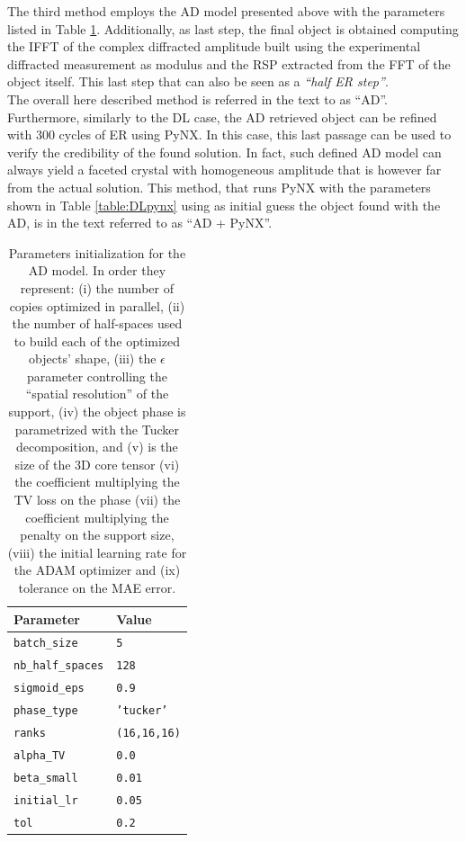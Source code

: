 The third method employs the AD model presented above with the parameters listed in Table \ref{table:AD}. 
Additionally, as last step, the final object is obtained computing the IFFT of the complex diffracted amplitude built 
using the experimental diffracted measurement as modulus and the RSP extracted from the FFT of the object itself.
This last step that can also be seen as a \textit{``half ER step''}.\\
The overall here described method is referred in the text to as ``AD''. 
Furthermore, similarly to the DL case, the AD retrieved object can be refined with 300 cycles of ER using PyNX. In this case, 
this last passage can be used to verify the credibility of the found solution. In fact, such defined AD model can always yield 
a faceted crystal with homogeneous amplitude that is however far from the actual solution. This method, that runs PyNX with the 
parameters shown in Table \ref{table:DLpynx} using as initial guess the object found with the AD, is in the text referred to as 
``AD + PyNX''. 

\begin{table}[H] 

  \centering
  {%
    \begin{tabular}{|l|l|}
      \hline
      \textbf{Parameter} & \textbf{Value} \\
      \hline 
      \texttt{batch\_size}                      & \texttt{5} \\
      \texttt{nb\_half\_spaces}                 & \texttt{128} \\
      \texttt{sigmoid\_eps}                     & \texttt{0.9} \\
      \texttt{phase\_type}                      & \texttt{'tucker'} \\
      \texttt{ranks}                            & \texttt{(16,16,16)} \\
      \texttt{alpha\_TV}                        & \texttt{0.0} \\
      \texttt{beta\_small}                      & \texttt{0.01} \\
      \texttt{initial\_lr}                      & \texttt{0.05} \\
      \texttt{tol}                              & \texttt{0.2} \\

      \hline
    \end{tabular}%
  } 
  \caption{Parameters initialization for the AD model. In order they represent: (i) the number of copies optimized in 
  parallel, (ii) the number of half-spaces used to build each of the optimized objects' shape, (iii) the $\epsilon$ parameter 
  controlling the ``spatial resolution'' of the support, (iv) the object phase is parametrized with the Tucker decomposition, 
  and (v) is the size of the 3D core tensor (vi) the coefficient multiplying the TV loss on the phase (vii) the coefficient multiplying 
  the penalty on the support size, (viii) the initial learning rate for the ADAM optimizer and (ix) tolerance on the MAE error.}
  \label{table:AD}
\end{table}


